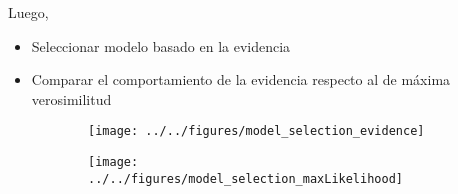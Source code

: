 \documentclass[a4paper,10pt]{article}
\begin{document}
Luego,

\begin{itemize}
 \item Seleccionar modelo basado en la evidencia
 \item Comparar el comportamiento de la evidencia respecto al de m\'axima verosimilitud
\end{itemize}

\begin{figure}[H]     
     \centering 
     \begin{subfigure}[b]{0.47\textwidth}
       \texttt{[image: ../../figures/model\_selection\_evidence]}
     \end{subfigure}
     \begin{subfigure}[b]{0.49\textwidth}
       \texttt{[image: ../../figures/model\_selection\_maxLikelihood]}
     \end{subfigure}
\end{figure}






{\footnotesize
 
 
}
\end{document}
